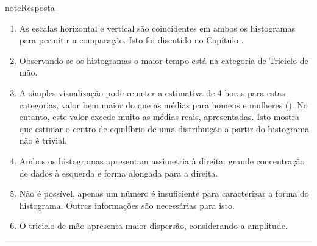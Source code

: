 \begin{sphinxadmonition}{note}{Resposta}
\begin{enumerate}
\item {} 
As escalas horizontal e vertical são coincidentes em ambos os histogramas para permitir a comparação. Isto foi discutido no Capítulo .

\item {} 
Observando-se os histogramas o maior tempo está na categoria de Triciclo de mão.

\item {} 
A simples visualização pode remeter a estimativa de 4 horas para estas categorias, valor bem maior do que as médias para homens e mulheres (). No entanto, este valor excede muito as médias reais, apresentadas. Isto mostra que estimar o centro de equilíbrio de uma distribuição a partir do histograma não é trivial.

\item {} 
Ambos os histogramas apresentam assimetria à direita: grande concentração de dados à esquerda e forma alongada para a direita.

\item {} 
Não é possível, apenas um número é insuficiente para caracterizar a forma do histograma. Outras informações são necessárias para isto.

\item {} 
O triciclo de mão apresenta maior dispersão, considerando a amplitude.

\end{enumerate}
\end{sphinxadmonition}


\label{\detokenize{PE104-3:explorando-medidas-de-dispersao}}\label{\detokenize{PE104-3::doc}}\label{\detokenize{PE104-3:sec-explorando2}}\label{\detokenize{PE104-3:ativ-estrategia-de-investimento}}

\bigskip\hrule\bigskip

